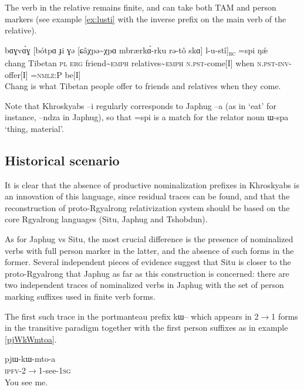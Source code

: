\documentclass[oldfontcommands,oneside,a4paper,11pt]{article}
\newcommand{\ipa}[1]{{\phon #1}} %
\newcommand{\rc}{\textsubscript{\textsc{rc}}}
\begin{document}
The verb in the relative remains finite, and can take both TAM and person markers (see example \ref{ex:lusti} with the inverse prefix on the main verb of the relative).
\begin{exe}
\ex \label{ex:lusti}
\gll
\ipa{bɑɣvɑ́ɣ}  	[\ipa{bótpɑ}  	\ipa{ɟi}  	\ipa{ɣə}  	[\ipa{ɕâχpə\textasciitilde{}χpɑ}  	\ipa{mbrærkɑ́-rku}  	\ipa{rə-tô}  	\ipa{skɑ}]  	\ipa{l-u-stî}]\rc{}  	\ipa{=spi}  	\ipa{ŋǽ}  \\
chang Tibetan \textsc{pl} \textsc{erg} friend\textasciitilde{}\textsc{emph}  relatives\textasciitilde{}\textsc{emph} \textsc{n.pst}-come[I] when \textsc{n.pst-inv}-offer[I] =\textsc{nmlz:P} be[I] \\
\glt Chang is what Tibetan people offer to friends and relatives when they come.
\end{exe}

Note that Khroskyabs \ipa{--i} regularly corresponds to Japhug \ipa{--a} (as in `eat' for instance, \ipa{--ndza} in Japhug), so that \ipa{=spi} is a match for the relator noun \ipa{ɯ-spa} `thing, material'.

\subsection{Historical scenario}

It is clear that the absence of productive nominalization prefixes in Khroskyabs is an innovation of this language, since residual traces can be found, and that the reconstruction of proto-Rgyalrong relativization system should be based on the core Rgyalrong languages (Situ, Japhug and Tshobdun).


As for Japhug vs Situ, the most crucial difference is the presence of nominalized verbs with full person marker in the latter, and the absence of such forms in the former. Several independent pieces of evidence suggest that Situ is closer to the proto-Rgyalrong  that Japhug as far as this construction is concerned: there are two independent traces of nominalized verbs  in Japhug with the set of person marking suffixes used in finite verb forms.

The first such trace in the portmanteau prefix \ipa{kɯ--} which appears in 2$\rightarrow$1 forms in the transitive paradigm together with the first person suffixes as in example \ref{pjWkWmtoa}.

\begin{exe}
\ex \label{pjWkWmtoa}
\gll
\ipa{pjɯ-kɯ-mto-a} \\
\textsc{ipfv}-2$\rightarrow$1-see-\textsc{1sg} \\
\glt You see me.
\end{exe}
\end{document}
